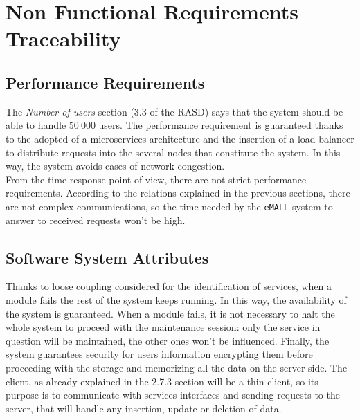 \newpage


\section{Non Functional Requirements Traceability}
\label{sec: non_functional_requirements_traceability}%

\subsection{Performance Requirements}
\label{subsec:performance_requirements}%
The \textit{Number of users} section (3.3 of the RASD) says that the system should be able to handle $50\ 000$ users.
The performance requirement is guaranteed thanks to the adopted of a microservices architecture and
the insertion of a load balancer to distribute requests into the several nodes that constitute the system.
In this way, the system avoids cases of network congestion. \\
From the time response point of view, there are not strict performance requirements.
According to the relations explained in the previous sections, there are not complex communications, so the time needed
by the \verb|eMALL| system to answer to received requests won't be high.

\subsection{Software System Attributes}
\label{subsec:software_system_attributes}%
Thanks to loose coupling considered for the identification of services, when a module fails the rest of the system keeps running.
In this way, the availability of the system is guaranteed.
When a module fails, it is not necessary to halt the whole system to proceed with the maintenance session:
only the service in question will be maintained, the other ones won't be influenced.
Finally, the system guarantees security for users information encrypting them before proceeding with the storage
and memorizing all the data on the server side.
The client, as already explained in the 2.7.3 section will be a thin client, so its purpose is to communicate with services
interfaces and sending requests to the server, that will handle any insertion, update or deletion of data.
